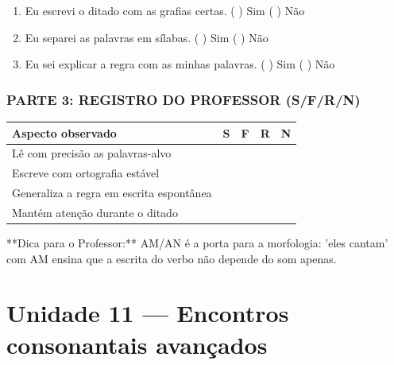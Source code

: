 \begin{exercicio}
\begin{enumerate}[label=\alph*)]
  \item Eu escrevi o ditado com as grafias certas.  \quad ( ) Sim   ( ) Não

  \item Eu separei as palavras em sílabas.  \quad ( ) Sim   ( ) Não

  \item Eu sei explicar a regra com as minhas palavras.  \quad ( ) Sim   ( ) Não

\end{enumerate}

\subsection*{PARTE 3: REGISTRO DO PROFESSOR (S/F/R/N)}

\begin{center}
\renewcommand{\arraystretch}{1.4}
\begin{tabular}{@{}p{9cm}cccc@{}}
\toprule
Aspecto observado & S & F & R & N \\
\midrule
Lê com precisão as palavras-alvo & & & & \\
Escreve com ortografia estável & & & & \\
Generaliza a regra em escrita espontânea & & & & \\
Mantém atenção durante o ditado & & & & \\
\bottomrule\end{tabular}\end{center}

\end{exercicio}

\begin{dica}
**Dica para o Professor:** AM/AN é a porta para a morfologia: 'eles cantam' com AM ensina que a escrita do verbo não depende do som apenas.
\end{dica}


\chapter{Unidade 11 --- Encontros consonantais avançados}


